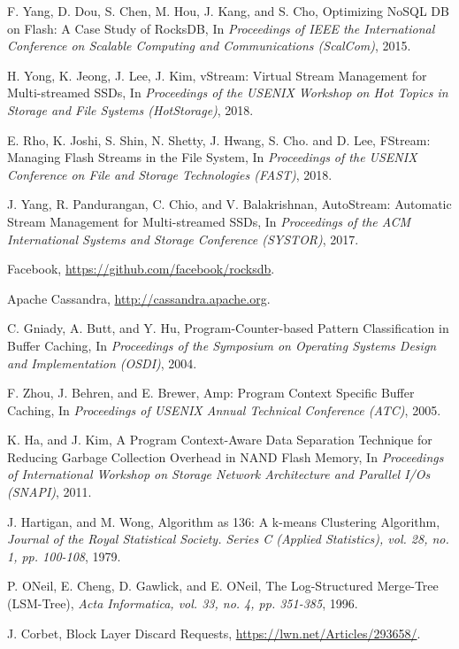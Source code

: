 \begin{thebibliography}{00}
F. Yang, D. Dou, S. Chen, M. Hou, J. Kang, and S. Cho,
Optimizing NoSQL DB on Flash: A Case Study of RocksDB,
In \textit{Proceedings of IEEE the International Conference on Scalable Computing
and Communications (ScalCom)}, 2015.

H. Yong, K. Jeong, J. Lee, J. Kim,
vStream: Virtual Stream Management for Multi-streamed SSDs,
In \textit{Proceedings of the USENIX Workshop on Hot Topics in Storage
and File Systems (HotStorage)}, 2018.

E. Rho, K. Joshi, S. Shin, N. Shetty, J. Hwang, S. Cho. and D. Lee,
FStream: Managing Flash Streams in the File System,
In \textit{Proceedings of the USENIX Conference on File and Storage Technologies (FAST)}, 2018.

J. Yang, R. Pandurangan, C. Chio, and V. Balakrishnan,
AutoStream: Automatic Stream Management for Multi-streamed SSDs,
In \textit{Proceedings of the ACM International Systems and Storage Conference (SYSTOR)}, 2017.

Facebook,
\url{https://github.com/facebook/rocksdb}.

Apache Cassandra,
\url{http://cassandra.apache.org}.


C. Gniady, A. Butt, and Y. Hu,
Program-Counter-based Pattern Classification in Buffer Caching,
In \textit{Proceedings of the Symposium on Operating Systems Design and Implementation (OSDI)}, 2004.

F. Zhou, J. Behren, and E. Brewer,
Amp: Program Context Specific Buffer Caching,
In \textit{Proceedings of USENIX Annual Technical Conference (ATC)}, 2005.

K. Ha, and J. Kim,
A Program Context-Aware Data Separation Technique for Reducing Garbage Collection Overhead in NAND Flash Memory,
In \textit{Proceedings of International Workshop on Storage Network Architecture 
and Parallel I/Os (SNAPI)}, 2011.

J. Hartigan, and M. Wong,
Algorithm as 136: A k-means Clustering Algorithm,
\textit{Journal of the Royal Statistical Society. Series C (Applied Statistics),
vol. 28, no. 1, pp. 100-108}, 1979.

P. ONeil, E. Cheng, D. Gawlick, and E. ONeil,
The Log-Structured Merge-Tree (LSM-Tree),
\textit{Acta Informatica, vol. 33, no. 4, pp. 351-385}, 1996.

J. Corbet,
Block Layer Discard Requests,
\url{https://lwn.net/Articles/293658/}.


\end{thebibliography}
